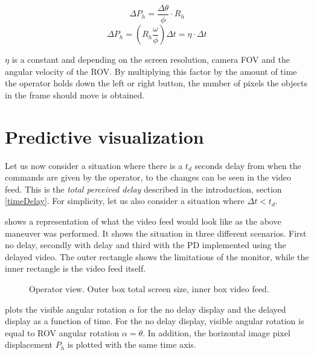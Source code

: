 \vspace{7mm}
\begin{equation}\label{deltaph}
\Delta P_h = \frac{\Delta \theta}{\phi}\cdot R_h
\end{equation}
\vspace{7mm}
\begin{equation}\label{pixelturnrate}
\Delta P_h = \left ( R_h\frac{\omega }{\phi} \right )\Delta t = \eta \cdot  \Delta t
\end{equation}
\vspace{0mm}

$\eta$ is a constant and depending on the screen resolution, camera FOV and the angular velocity of the ROV. By multiplying this factor by the amount of time the operator holds down the left or right button, the number of pixels the objects in the frame should move is obtained.

\section{Predictive visualization}

Let us now consider a situation where there is a $t_d$ seconds delay from when the commands are given by the operator, to the changes can be seen in the video feed. This is the \emph{total perceived delay} described in the introduction, section \ref{timeDelay}. For simplicity, let us also consider a situation where $\Delta t < t_d$.

 shows a representation of what the video feed would look like as the above maneuver was performed. It shows the situation in three different scenarios. First no delay, secondly with delay and third with the PD implemented using the delayed video. The outer rectangle shows the limitations of the monitor, while the inner rectangle is the video feed itself.

\begin{figure}[h!]    
    \centering           
    \def\svgwidth{.8\columnwidth}
    
    \caption{Operator view. Outer box total screen size, inner box video feed.}
    \label{movie}
\end{figure}

 plots the visible angular rotation $\alpha$ for the no delay display and the delayed display as a function of time. For the no delay display, visible angular rotation is equal to ROV angular rotation $\alpha = \theta$. In addition, the horizontal image pixel displacement $P_h$ is plotted with the same time axis.

